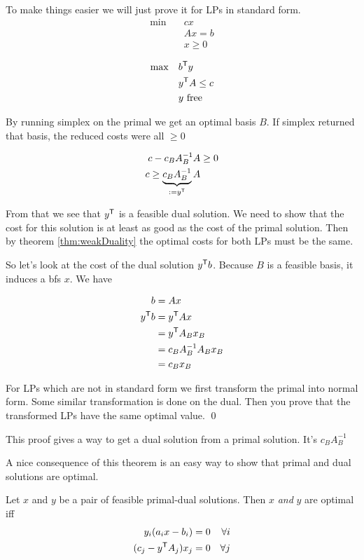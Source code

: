 \begin{pr} To make things easier we will just prove it for LPs in standard form.
\begin{align*}
\min \quad & cx\\
& Ax = b\\
&x\geq 0
\end{align*}

\begin{align*}
\max \quad &{b}^\text{\upshape \sffamily T}y\\
& {y}^\text{\upshape \sffamily T}A \leq c\\
& y \text{ free}
\end{align*}

By running simplex on the primal we get an optimal basis $B$. If simplex returned that basis, the reduced costs were all $\geq 0$

\begin{align*}
c-c_BA_B^{-1}A &\geq 0\\
c \geq \underbrace{c_BA_B^{-1}}_{:={y}^\text{\upshape \sffamily T}}A
\end{align*}

From that we see that ${y}^\text{\upshape \sffamily T}$ is a feasible dual solution. We need to show that the cost for this solution is at least as good as the cost of the primal solution. Then by theorem \ref{thm:weakDuality} the optimal costs for both LPs must be the same.

So let's look at the cost of the dual solution ${y}^\text{\upshape \sffamily T} b$. Because $B$ is a feasible basis, it induces a bfs $x$. We have

\begin{align*}
b &= Ax\\
{y}^\text{\upshape \sffamily T} b &= {y}^\text{\upshape \sffamily T} A x\\
 &={y}^\text{\upshape \sffamily T} A_B x_B\\
 &=c_B A_B^{-1}A_B x_B\\
 &=c_B x_B
 \end{align*}
 
 For LPs which are not in standard form we first transform the primal into normal form. Some similar transformation is done on the dual. Then you prove that the transformed LPs have the same optimal value.
\qed \end{pr}

This proof gives a way to get a dual solution from a primal solution. It's $c_BA_B^{-1}$

A nice consequence of this theorem is an easy way to show that primal and dual solutions are optimal.

\begin{thm} Let $x$ and $y$ be a pair of feasible primal-dual solutions. Then $x$ \emph{and} $y$ are optimal iff
\begin{align*}
y_i(a_ix-b_i) = 0 && \forall i\\ 
(c_j - {y}^\text{\upshape \sffamily T}A_j)x_j =0 && \forall j
\end{align*}
\end{thm}

